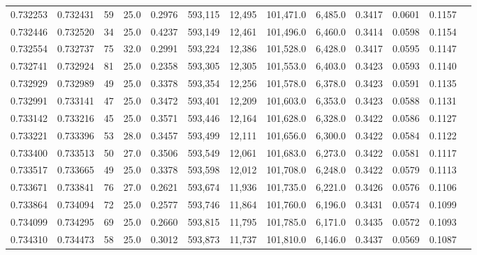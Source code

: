 \begin{tabular}{rrrrrrrrrrrrr}
0.732253 & 0.732431 &    59 & 25.0 &                                     0.2976 & 593,115 &  12,495 & 101,471.0 &   6,485.0 & 0.3417 & 0.0601 & 0.1157 \\
0.732446 & 0.732520 &    34 & 25.0 &                                     0.4237 & 593,149 &  12,461 & 101,496.0 &   6,460.0 & 0.3414 & 0.0598 & 0.1154 \\
0.732554 & 0.732737 &    75 & 32.0 &                                     0.2991 & 593,224 &  12,386 & 101,528.0 &   6,428.0 & 0.3417 & 0.0595 & 0.1147 \\
0.732741 & 0.732924 &    81 & 25.0 &                                     0.2358 & 593,305 &  12,305 & 101,553.0 &   6,403.0 & 0.3423 & 0.0593 & 0.1140 \\
0.732929 & 0.732989 &    49 & 25.0 &                                     0.3378 & 593,354 &  12,256 & 101,578.0 &   6,378.0 & 0.3423 & 0.0591 & 0.1135 \\
0.732991 & 0.733141 &    47 & 25.0 &                                     0.3472 & 593,401 &  12,209 & 101,603.0 &   6,353.0 & 0.3423 & 0.0588 & 0.1131 \\
0.733142 & 0.733216 &    45 & 25.0 &                                     0.3571 & 593,446 &  12,164 & 101,628.0 &   6,328.0 & 0.3422 & 0.0586 & 0.1127 \\
0.733221 & 0.733396 &    53 & 28.0 &                                     0.3457 & 593,499 &  12,111 & 101,656.0 &   6,300.0 & 0.3422 & 0.0584 & 0.1122 \\
0.733400 & 0.733513 &    50 & 27.0 &                                     0.3506 & 593,549 &  12,061 & 101,683.0 &   6,273.0 & 0.3422 & 0.0581 & 0.1117 \\
0.733517 & 0.733665 &    49 & 25.0 &                                     0.3378 & 593,598 &  12,012 & 101,708.0 &   6,248.0 & 0.3422 & 0.0579 & 0.1113 \\
0.733671 & 0.733841 &    76 & 27.0 &                                     0.2621 & 593,674 &  11,936 & 101,735.0 &   6,221.0 & 0.3426 & 0.0576 & 0.1106 \\
0.733864 & 0.734094 &    72 & 25.0 &                                     0.2577 & 593,746 &  11,864 & 101,760.0 &   6,196.0 & 0.3431 & 0.0574 & 0.1099 \\
0.734099 & 0.734295 &    69 & 25.0 &                                     0.2660 & 593,815 &  11,795 & 101,785.0 &   6,171.0 & 0.3435 & 0.0572 & 0.1093 \\
0.734310 & 0.734473 &    58 & 25.0 &                                     0.3012 & 593,873 &  11,737 & 101,810.0 &   6,146.0 & 0.3437 & 0.0569 & 0.1087 \\

\end{tabular}
